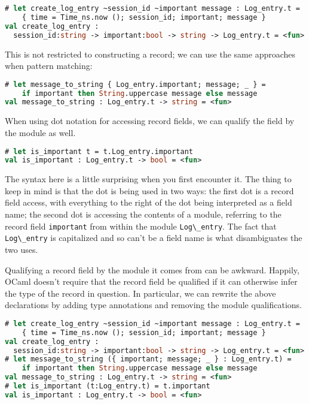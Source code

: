 \begin{lstlisting}[language=Caml]
# let create_log_entry ~session_id ~important message : Log_entry.t =
    { time = Time_ns.now (); session_id; important; message }
val create_log_entry :
  session_id:string -> important:bool -> string -> Log_entry.t = <fun>
\end{lstlisting}

This is not restricted to constructing a record; we can use the same
approaches when pattern matching:

\begin{lstlisting}[language=Caml]
# let message_to_string { Log_entry.important; message; _ } =
    if important then String.uppercase message else message
val message_to_string : Log_entry.t -> string = <fun>
\end{lstlisting}

When using dot notation for accessing record fields, we can qualify the
field by the module as well.

\begin{lstlisting}[language=Caml]
# let is_important t = t.Log_entry.important
val is_important : Log_entry.t -> bool = <fun>
\end{lstlisting}

The syntax here is a little surprising when you first encounter it. The
thing to keep in mind is that the dot is being used in two ways: the
first dot is a record field access, with everything to the right of the
dot being interpreted as a field name; the second dot is accessing the
contents of a module, referring to the record field
\passthrough{\lstinline!important!} from within the module
\passthrough{\lstinline!Log\_entry!}. The fact that
\passthrough{\lstinline!Log\_entry!} is capitalized and so can't be a
field name is what disambiguates the two uses.

Qualifying a record field by the module it comes from can be awkward.
Happily, OCaml doesn't require that the record field be qualified if it
can otherwise infer the type of the record in question. In particular,
we can rewrite the above declarations by adding type annotations and
removing the module qualifications.

\begin{lstlisting}[language=Caml]
# let create_log_entry ~session_id ~important message : Log_entry.t =
    { time = Time_ns.now (); session_id; important; message }
val create_log_entry :
  session_id:string -> important:bool -> string -> Log_entry.t = <fun>
# let message_to_string ({ important; message; _ } : Log_entry.t) =
    if important then String.uppercase message else message
val message_to_string : Log_entry.t -> string = <fun>
# let is_important (t:Log_entry.t) = t.important
val is_important : Log_entry.t -> bool = <fun>
\end{lstlisting}

